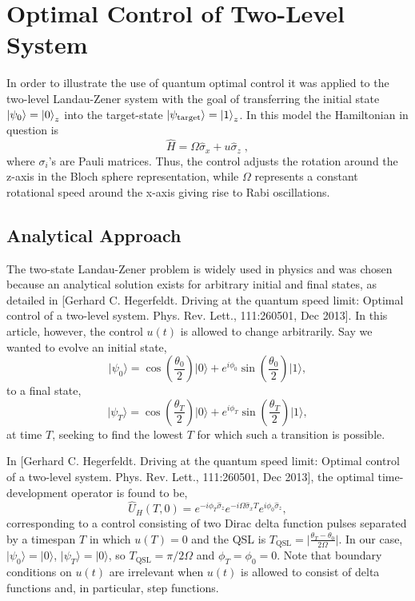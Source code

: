 \chapter{Optimal Control of Two-Level System}
In order to illustrate the use of quantum optimal control it was applied to the two-level Landau-Zener system with the goal of transferring the initial state $\ket{\psi _0} = \ket{0}_z$ into the target-state $\ket{\psi _{\mathrm{target}}} = \ket{1}_z$. In this model the Hamiltonian in question is
\begin{equation}\label{eq:LZ_ham}
	\hat{H} = \Omega \hat{\sigma}_x + u \hat{\sigma}_z \; ,
\end{equation}
where $\sigma_i$'s are Pauli matrices. Thus, the control adjusts the rotation around the z-axis in the Bloch sphere representation, while $\Omega$ represents a constant rotational speed around the x-axis giving rise to Rabi oscillations.

\section{Analytical Approach}
The two-state Landau-Zener problem is widely used in physics and was chosen because an analytical solution exists for arbitrary initial and final states, as detailed in [Gerhard C. Hegerfeldt. Driving at the quantum speed limit: Optimal control of a
two-level system. Phys. Rev. Lett., 111:260501, Dec 2013]. In this article, however, the control $u(t)$ is allowed to change arbitrarily. Say we wanted to evolve an initial state,
\begin{equation}
\lvert \psi_0 \rangle = \cos{\left(\frac{\theta_0}{2}\right)} \lvert 0 \rangle + e^{i\phi_0}\sin{\left(\frac{\theta_0}{2}\right)}\lvert 1 \rangle,
\end{equation}
to a final state,
\begin{equation}
\lvert \psi_T \rangle = \cos{\left(\frac{\theta_T}{2}\right)} \lvert 0 \rangle + e^{i\phi_T}\sin{\left(\frac{\theta_T}{2}\right)}\lvert 1 \rangle,
\end{equation}
at time $T$, seeking to find the lowest $T$ for which such a transition is possible.

In [Gerhard C. Hegerfeldt. Driving at the quantum speed limit: Optimal control of a
two-level system. Phys. Rev. Lett., 111:260501, Dec 2013], the optimal time-development operator is found to be,
\begin{equation}
\hat{U}_H(T,0)=e^{-i\phi_T\hat{\sigma}_z}e^{-i\Omega\hat{\sigma}_xT}e^{i\phi_0\hat{\sigma}_z},
\end{equation}
corresponding to a control consisting of two Dirac delta function pulses separated by a timespan $T$ in which $u(T)=0$ and the QSL is $T_{\mathrm{QSL}}=\lvert\frac{\theta_T-\theta_0}{2\Omega}\rvert$. In our case, $\lvert\psi_0\rangle=\lvert 0\rangle$, $\lvert\psi_T\rangle=\lvert 0\rangle$, so $T_{\mathrm{QSL}}=\pi/2\Omega$ and $\phi_T=\phi_0=0$. Note that boundary conditions on $u(t)$ are irrelevant when $u(t)$ is allowed to consist of delta functions and, in particular, step functions.

